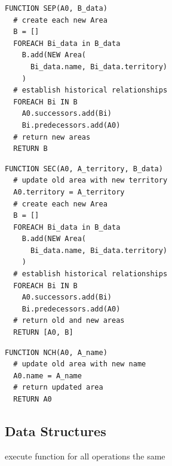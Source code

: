 \begin{minipage}[t]{0.47\textwidth}
\begin{lstlisting}[language=pseudocode,
  caption=Separation]
FUNCTION SEP(A0, B_data)
  # create each new Area
  B = []
  FOREACH Bi_data in B_data
    B.add(NEW Area(
      Bi_data.name, Bi_data.territory)
    )
  # establish historical relationships
  FOREACH Bi IN B
    A0.successors.add(Bi)
    Bi.predecessors.add(A0)
  # return new areas
  RETURN B

\end{lstlisting}
\end{minipage}    %
\hspace{3.5em}    %
\begin{minipage}[t]{0.47\textwidth}
\begin{lstlisting}[language=pseudocode,
  caption=Secession]
FUNCTION SEC(A0, A_territory, B_data)
  # update old area with new territory
  A0.territory = A_territory
  # create each new Area
  B = []
  FOREACH Bi_data in B_data
    B.add(NEW Area(
      Bi_data.name, Bi_data.territory)
    )
  # establish historical relationships
  FOREACH Bi IN B
    A0.successors.add(Bi)
    Bi.predecessors.add(A0)
  # return old and new areas
  RETURN [A0, B]

\end{lstlisting}
\end{minipage}

\vspace{-1.5em}
\begin{minipage}[t]{0.47\textwidth}
\begin{lstlisting}[language=pseudocode,
  caption=Name Change]
FUNCTION NCH(A0, A_name)
  # update old area with new name
  A0.name = A_name
  # return updated area
  RETURN A0

\end{lstlisting}
\end{minipage}



\subsection{Data Structures} %
\label{sub:data_structures}

execute function for all operations the same

